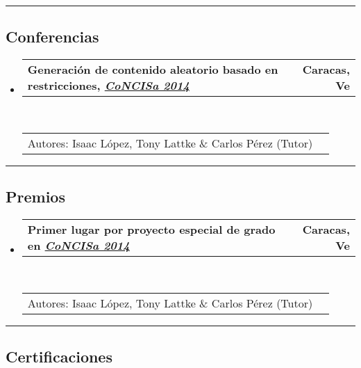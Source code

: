 \documentclass[10pt,letterpaper]{article}
\makeatletter
\newcommand{\headerrow}[2]
{\begin{tabular*}{\linewidth}{l@{\extracolsep{\fill}}r}
	#1 &
	#2 \\
\end{tabular*}}
\makeatother
\begin{document}
\hrule
\vspace{-0.4em}
\subsection*{Conferencias}

\begin{itemize}
  \parskip=0.1em
\item 
   \headerrow
   {\textbf{Generación de contenido aleatorio basado en restricciones, \emph{\href{http://www.concisa.net.ve/2014/}{CoNCISa 2014}}}}
   {\textbf{Caracas, Ve}}
  \\
  \headerrow
   {Autores: Isaac López, Tony Lattke \& Carlos Pérez (Tutor)}{}
\end{itemize}

\hrule
\vspace{-0.4em}
\subsection*{Premios}

\begin{itemize}
  \parskip=0.1em
\item 
   \headerrow
   {\textbf{Primer lugar por proyecto especial de grado en \emph{\href{http://www.concisa.net.ve/2014/}{CoNCISa 2014}}}}
   {\textbf{Caracas, Ve}}
  \\
  \headerrow
   {Autores: Isaac López, Tony Lattke \& Carlos Pérez (Tutor)}{}
\end{itemize}

\newpage
\hrule
\vspace{-0.4em}
\subsection*{Certificaciones}
\end{document}
